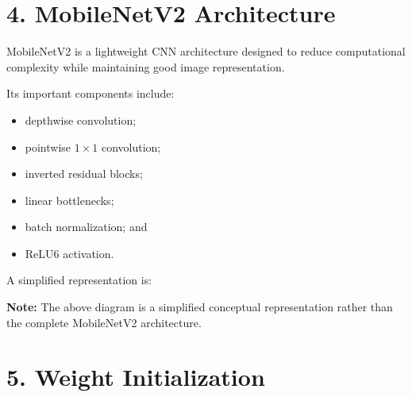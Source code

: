 \documentclass[10pt]{article}
\begin{document}
\section*{4. MobileNetV2 Architecture}

MobileNetV2 is a lightweight CNN architecture designed to reduce
computational complexity while maintaining good image representation.

Its important components include:

\begin{itemize}
\item depthwise convolution;
\item pointwise $1\times1$ convolution;
\item inverted residual blocks;
\item linear bottlenecks;
\item batch normalization; and
\item ReLU6 activation.
\end{itemize}

A simplified representation is:

\begin{center}
\end{center}

\textbf{Note:} The above diagram is a simplified conceptual representation
rather than the complete MobileNetV2 architecture.

\section*{5. Weight Initialization}
\end{document}
